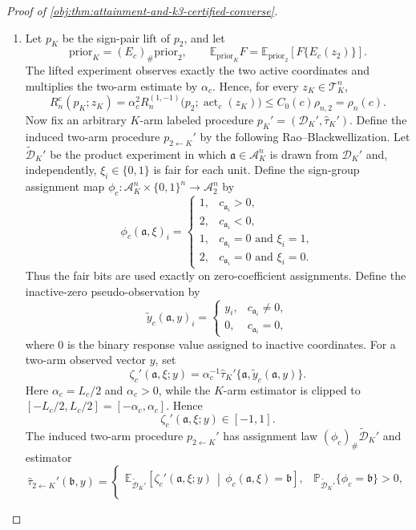 \begin{proof}[Proof of \cref{obj:thm:attainment-and-k3-certified-converse}]
\begin{enumerate}
\item Let \(p_K\) be the sign-pair lift of \(p_2\), and let
\[
\mathrm{prior}_K=(E_c)_\#\mathrm{prior}_2,
\qquad
\mathbb E_{\mathrm{prior}_K}F
=
\mathbb E_{\mathrm{prior}_2}\!\left[F\{E_c(z_2)\}\right].
\]
The lifted experiment observes exactly the two active coordinates and multiplies the two-arm estimate by \(\alpha_c\). Hence, for every \(z_K\in\mathcal T_K^n\),
\[
R_n^c(p_K;z_K)
=
\alpha_c^2
R_n^{(1,-1)}
\bigl(p_2;\operatorname{act}_c(z_K)\bigr)
\le
C_0(c)\rho_{n,2}
=
\rho_n(c).
\]
Now fix an arbitrary \(K\)-arm labeled procedure \(p_K'=(\mathcal D_K',\widehat\tau_K')\). Define the induced two-arm procedure \(p_{2\leftarrow K}'\) by the following Rao--Blackwellization. Let \(\widetilde{\mathcal D}_K'\) be the product experiment in which \(\mathfrak a\in\mathcal A_K^n\) is drawn from \(\mathcal D_K'\) and, independently, \(\xi_i\in\{0,1\}\) is fair for each unit. Define the sign-group assignment map \(\phi_c:\mathcal A_K^n\times\{0,1\}^n\to\mathcal A_2^n\) by
\[
\phi_c(\mathfrak a,\xi)_i
=
\begin{cases}
1, & c_{\mathfrak a_i}>0,\\
2, & c_{\mathfrak a_i}<0,\\
1, & c_{\mathfrak a_i}=0\text{ and }\xi_i=1,\\
2, & c_{\mathfrak a_i}=0\text{ and }\xi_i=0.
\end{cases}
\]
Thus the fair bits are used exactly on zero-coefficient assignments. Define the inactive-zero pseudo-observation by
\[
\widetilde y_c(\mathfrak a,y)_i
=
\begin{cases}
y_i, & c_{\mathfrak a_i}\ne 0,\\
0, & c_{\mathfrak a_i}=0,
\end{cases}
\]
where \(0\) is the binary response value assigned to inactive coordinates. For a two-arm observed vector \(y\), set
\[
\zeta_c'(\mathfrak a,\xi;y)
=
\alpha_c^{-1}\widehat\tau_K'\{\mathfrak a,\widetilde y_c(\mathfrak a,y)\}.
\]
Here \(\alpha_c=L_c/2\) and \(\alpha_c>0\), while the \(K\)-arm estimator is clipped to \([-L_c/2,L_c/2]=[-\alpha_c,\alpha_c]\). Hence
\[
\zeta_c'(\mathfrak a,\xi;y)\in[-1,1].
\]
The induced two-arm procedure \(p_{2\leftarrow K}'\) has assignment law \((\phi_c)_\#\widetilde{\mathcal D}_K'\) and estimator
\[
\widehat\tau_{2\leftarrow K}'(\mathfrak b,y)
=
\begin{cases}
\mathbb E_{\widetilde{\mathcal D}_K'}\!\left[
\zeta_c'(\mathfrak a,\xi;y)
\,\middle|\,\phi_c(\mathfrak a,\xi)=\mathfrak b
\right],
&\mathbb P_{\widetilde{\mathcal D}_K'}\{\phi_c=\mathfrak b\}>0,\\[0.5ex]

\end{cases}\]
\end{enumerate}
\end{proof}
